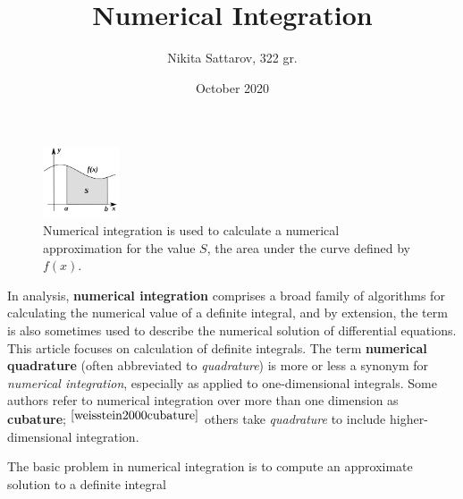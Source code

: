 \documentclass[a4paper]{article}
\title{Numerical Integration}
\author{Nikita Sattarov, 322 gr.}
\date{October 2020}
\begin{document}
\maketitle
\newcommand{\ds}{\displaystyle}


\begin{figure}
	\begin{center}
		\includegraphics[width=0.2\textwidth]{1}
	\end{center}
	\caption{Numerical integration is used to calculate a numerical approximation for the value ${\ds S}$, the area under the curve defined by ${\ds f(x)}$.}
\end{figure}
In analysis, \textbf{numerical integration} comprises a broad family of algorithms for calculating the numerical value of a definite integral, and by extension, the term is also sometimes used to describe the numerical solution of differential equations. This article focuses on calculation of definite integrals. The term \textbf{numerical quadrature} (often abbreviated to \textit{quadrature}) is more or less a synonym for \textit{numerical integration}, especially as applied to one-dimensional integrals. Some authors refer to numerical integration over more than one dimension as \textbf{cubature};$^{~\cite{weisstein2000cubature}}$ others take \textit{quadrature} to include higher-dimensional integration.

The basic problem in numerical integration is to compute an approximate solution to a definite integral
\end{document}

